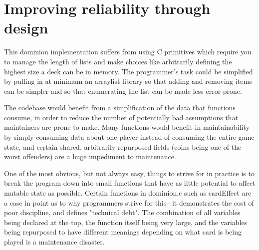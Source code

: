 \documentclass[11pt]{article}
\begin{document}
\section{Improving reliability through design}
This dominion implementation suffers from using C primitives which require you to manage the length of lists and make choices like arbitrarily defining the highest size a deck can be in memory. The programmer's task could be simplified by pulling in at minimum an arraylist library so that adding and removing items can be simpler and so that enumerating the list can be made less error-prone.

The codebase would benefit from a simplification of the data that functions consume, in order to reduce the number of potentially bad assumptions that maintainers are prone to make. Many functions would benefit in maintainability by simply consuming data about one player instead of consuming the entire game state, and certain shared, arbitrarily repurposed fields (coins being one of the worst offenders) are a huge impediment to maintenance.

One of the most obvious, but not always easy, things to strive for in practice is to break the program down into small functions that have as little potential to affect mutable state as possible. Certain functions in dominion.c such as cardEffect are a case in point as to why programmers strive for this-- it demonstrates the cost of poor discipline, and defines "technical debt". The combination of all variables being declared at the top, the function itself being very large, and the variables being repurposed to have different meanings depending on what card is being played is a maintenance disaster.
\end{document}
